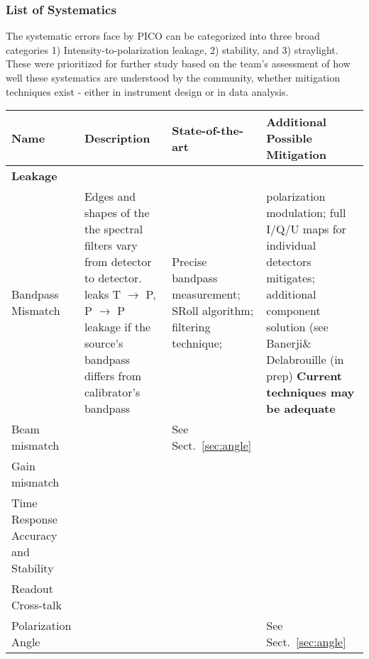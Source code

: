 \documentclass[PICOReport.tex]{subfiles}
\begin{document}
\subsubsection{List of Systematics}
The systematic errors face by PICO can be categorized into three broad categories 
1) Intensity-to-polarization leakage, 2) stability, and 3)
straylight.    These were prioritized for further study based on the
team's assessment of how well these systematics are understood by the
community, whether mitigation techniques exist - either in instrument
design or in data analysis.

\begin{table}[h!]
\centering
\scriptsize
 \begin{tabular}{p{4.1cm} p{4.1cm} p{4.1cm} p{4.1cm}}
 \hline
\textbf{Name} & \textbf{Description} & \textbf{State-of-the-art} & \textbf{Additional Possible Mitigation} \\
 \hline
\textbf{Leakage} & &\\
 Bandpass Mismatch & 
 Edges and shapes of the the spectral filters vary from detector to detector. leaks T $\to$ P, P $\to$ P leakage if the source's bandpass differs from calibrator's bandpass\cite{Hoang_2017} & Precise bandpass measurement\cite{Pajot_2010};
SRoll algorithm\cite{Planck_Lowell}; filtering technique\cite{CORE_systematics};   &
polarization modulation; full I/Q/U maps for individual detectors
                                                                                     mitigates;
                                                                                     additional
                                                                                     component
                                                                                     solution
                                                                                     (see
                                                                                     Banerji\&
                                                                                              Delabrouille
                                                                                               (in
                                                                                             prep)
                                                                                               \textbf{Current
                                                                                     techniques may be adequate}  \\
Beam mismatch & & See Sect.~\ref{sec:angle}
\\
Gain mismatch &
\\
Time Response Accuracy and Stability  &
\\
Readout Cross-talk & &
\\
Polarization Angle & & &
See Sect.~\ref{sec:angle}
\\


\end{tabular}
\end{table}
\end{document}
